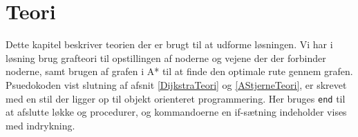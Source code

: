 \chapter{Teori}\label{Teori}
Dette kapitel beskriver teorien der er brugt til at udforme løsningen. Vi har i løsning brug grafteori til opstillingen af noderne og vejene der der forbinder noderne, samt brugen af grafen i A* til at finde den optimale rute gennem grafen. Psuedokoden vist slutning af afsnit \ref{DijkstraTeori} og \ref{AStjerneTeori}, er skrevet med en stil der ligger op til objekt orienteret programmering. Her bruges \texttt{end} til at afslutte løkke og procedurer, og kommandoerne en if-sætning indeholder vises med indrykning.
\newpage

\newpage

















